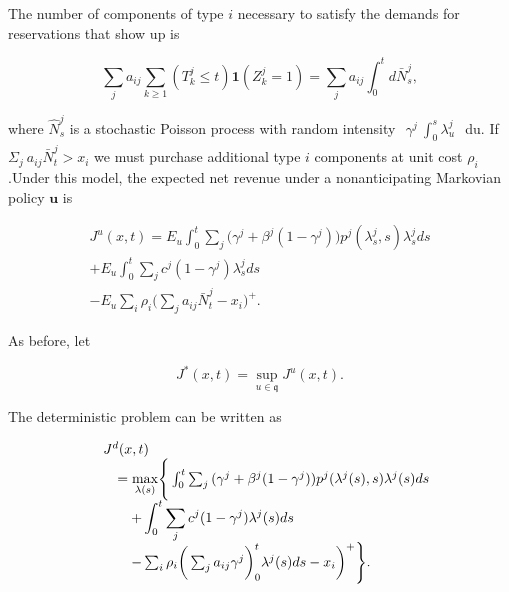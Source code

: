 The number of components of type \(i\) necessary to satisfy the demands
for reservations that show up is

\[
\sum _ { j } a _ { i j } \sum _ { k \geqslant 1 } ( T _ { k } ^ { j } \leqslant t ) \mathbf { 1 } ( Z _ { k } ^ { j } = 1 ) = \sum _ { j } a _ { i j } \int _ { 0 } ^ { t } d \bar { N } _ { s } ^ { j } ,
\]

where \(\hat { N } _ { s } ^ { j }\) is a stochastic Poisson process
with random intensity
\(\begin{array} { r } { \gamma ^ { j } \ \int _ { 0 } ^ { s } \lambda _ { u } ^ { j } } \end{array}\)
du. If
\(\Sigma _ { j } \ a _ { i j } \bar { N } _ { t } ^ { j } > x _ { i }\)
we must purchase additional type \(i\) components at unit cost
\(\rho _ { i }\) .Under this model, the expected net revenue under a
nonanticipating Markovian policy \(\boldsymbol { u }\) is

\[
\begin{array} { l } { \displaystyle { J ^ { u } ( x , t ) = E _ { u } \int _ { 0 } ^ { t } \sum _ { j } \big ( \gamma ^ { j } + \beta ^ { j } ( 1 - \gamma ^ { j } ) \big ) p ^ { j } ( \lambda _ { s } ^ { j } , s ) \lambda _ { s } ^ { j } d s } } \\ { \displaystyle { + E _ { u } \int _ { 0 } ^ { t } \sum _ { j } c ^ { j } ( 1 - \gamma ^ { j } ) \lambda _ { s } ^ { j } d s } } \\ { \displaystyle { - E _ { u } \sum _ { i } \rho _ { i } \Big ( \sum _ { j } a _ { i j } \bar { N } _ { t } ^ { j } - x _ { i } \Big ) ^ { + } . } } \end{array}
\]

As before, let

\[
J ^ { * } ( x , t ) = \operatorname* { s u p } _ { u \in \mathfrak { q } } J ^ { u } ( x , t ) .
\]

The deterministic problem can be written as

\[
\begin{array} { r l } & { J ^ { d } ( x , t ) } \\ & { \quad = \underset { \lambda ( s ) } { \operatorname* { m a x } } \Bigg \{ \int _ { 0 } ^ { t } \sum _ { j } { ( \gamma ^ { j } + \beta ^ { j } ( 1 - \gamma ^ { j } ) ) p ^ { j } ( \lambda ^ { j } ( s ) , s ) \lambda ^ { j } ( s ) d s } } \\ & { \qquad + \displaystyle \int _ { 0 } ^ { t } \sum _ { j } { c ^ { j } ( 1 - \gamma ^ { j } ) \lambda ^ { j } ( s ) d s } } \\ & { \qquad - \sum _ { i } \rho _ { i } \bigg ( \sum _ { j } { a _ { i j } \gamma ^ { j } } \bigg ) _ { 0 } ^ { t } \lambda ^ { j } ( s ) d s - x _ { i } \bigg ) ^ { + } \Bigg \} . } \end{array}
\]

